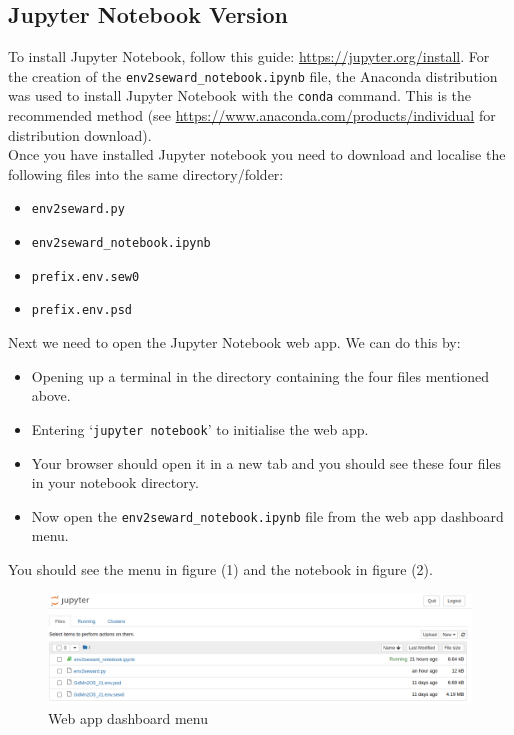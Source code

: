 \documentclass[10pt]{article}
\begin{document}
\subsection{Jupyter Notebook Version}
To install Jupyter Notebook, follow this guide: \url{https://jupyter.org/install}. For the creation of the \texttt{env2seward\_notebook.ipynb} file, the Anaconda distribution was used to install Jupyter Notebook with the \texttt{conda} command. This is the recommended method (see \url{https://www.anaconda.com/products/individual} for distribution download). 
\\
Once you have installed Jupyter notebook you need to download and localise the following files into the same directory/folder:

\begin{itemize}
	\item \texttt{env2seward.py}
	\item \texttt{env2seward\_notebook.ipynb}
	\item \texttt{prefix.env.sew0}
	\item \texttt{prefix.env.psd}
\end{itemize}
Next we need to open the Jupyter Notebook web app. We can do this by:

\begin{itemize}
	\item Opening up a terminal in the directory containing the four files mentioned above.
	\item Entering `\texttt{jupyter notebook}' to initialise the web app.
	\item Your browser should open it in a new tab and you should see these four files in your notebook directory.
	\item Now open the \texttt{env2seward\_notebook.ipynb} file from the web app dashboard menu.
\end{itemize}

You should see the menu in figure (1) and the notebook in figure (2).

\begin{figure}
	\centering
	\includegraphics[width=1.3\linewidth]{dashboard.png}
	\caption{Web app dashboard menu}
	\label{fig:screenshot-from-2020-06-23-12-26-13}
\end{figure}
\end{document}

